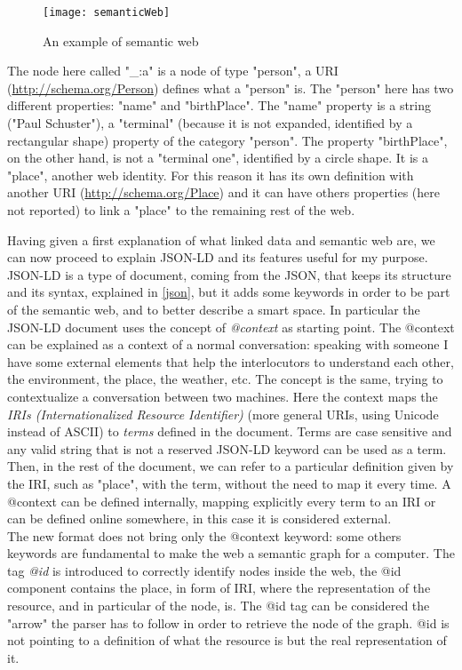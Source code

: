 \begin{figure}[h]
	\centering
	\texttt{[image: semanticWeb]}
	\caption{An example of semantic web}
	\label{4.4:semanticWeb}
\end{figure}

The node here called "\_:a" is a node of type "person", a URI  (\url{http://schema.org/Person}) defines what a "person" is. The "person" here has two different properties: "name" and "birthPlace". The "name" property is a string ("Paul Schuster"), a "terminal" (because it is not expanded, identified by a rectangular shape) property of the category "person". The property "birthPlace", on the other hand, is not a "terminal one", identified by a circle shape. It is a "place", another web identity. For this reason it has its own definition with another URI (\url{http://schema.org/Place}) and it can have others properties (here not reported) to link a "place" to the remaining rest of the web.
\par Having given a first explanation of what linked data and semantic web are, we can now proceed to explain JSON-LD and its features useful for my purpose. JSON-LD is a type of document, coming from the JSON, that keeps its structure and its syntax, explained in \ref{json}, but it adds some keywords in order to be part of the semantic web, and to better describe a smart space. In particular the JSON-LD document uses the concept of \textit{@context} as starting point. The @context can be explained as a context of a normal conversation: speaking with someone I have some external elements that help the interlocutors to understand each other, the environment, the place, the weather, etc. The concept is the same, trying to contextualize a conversation between two machines. Here the context maps the \textit{IRIs (Internationalized Resource Identifier)} (more general URIs, using Unicode instead of ASCII) to \textit{terms} defined in the document. Terms are case sensitive and any valid string that is not a reserved JSON-LD keyword can be used as a term. Then, in the rest of the document, we can refer to a particular definition given by the IRI, such as "place", with the term, without the need to map it every time. A @context can be defined internally, mapping explicitly every term to an IRI or can be defined online somewhere, in this case it is considered external. \\
The new format does not bring only the @context keyword: some others keywords are fundamental to make the web a semantic graph for a computer. The tag \textit{@id} is introduced to correctly identify nodes inside the web, the @id component contains the place, in form of IRI, where the representation of the resource, and in particular of the node, is. The @id tag can be considered the "arrow" the parser has to follow in order to retrieve the node of the graph. @id is not pointing to a definition of what the resource is but the real representation of it.

